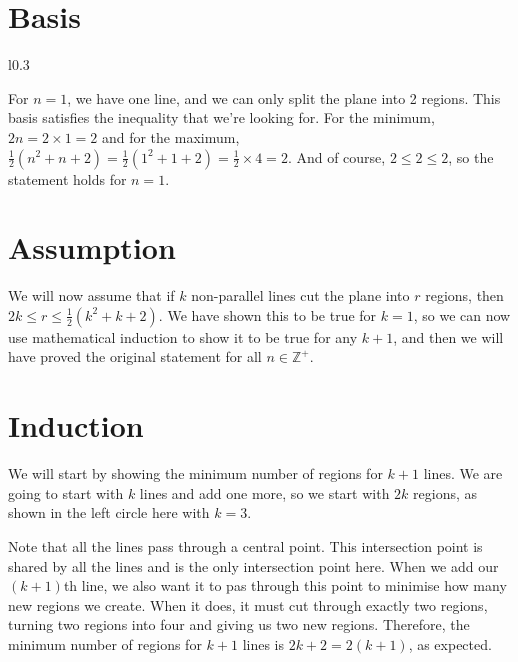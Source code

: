 \documentclass[a4paper]{article}
\newcommand{\half}{\frac{1}{2}}
\newcommand{\hexpr}[1]{\half(#1^2 + #1 + 2)}
\begin{document}
\section{Basis}

\begin{wrapfigure}[5]{l}{0.3\linewidth}
\vspace{-1em}
\end{wrapfigure}

For $n = 1$, we have one line, and we can only split the plane into 2 regions. This basis satisfies the inequality that we're looking for. For the minimum, $2n = 2 \times 1 = 2$ and for the maximum, $\hexpr{n} = \hexpr{1} = \half \times 4 = 2$. And of course, $2 \leq 2 \leq 2$, so the statement holds for $n = 1$.

\vspace{4em}

\section{Assumption}

We will now assume that if $k$ non-parallel lines cut the plane into $r$ regions, then $2k \leq r \leq \hexpr{k}$. We have shown this to be true for $k = 1$, so we can now use mathematical induction to show it to be true for any $k + 1$, and then we will have proved the original statement for all $n \in \mathbb{Z}^+$.

\newpage

\section{Induction}

We will start by showing the minimum number of regions for $k + 1$ lines. We are going to start with $k$ lines and add one more, so we start with $2k$ regions, as shown in the left circle here with $k = 3$.

Note that all the lines pass through a central point. This intersection point is shared by all the lines and is the only intersection point here. When we add our $(k + 1)$th line, we also want it to pas through this point to minimise how many new regions we create. When it does, it must cut through exactly two regions, turning two regions into four and giving us two new regions. Therefore, the minimum number of regions for $k + 1$ lines is $2k + 2 = 2(k + 1)$, as expected.
\end{document}
